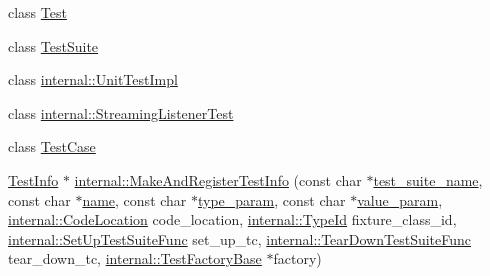 \begin{DoxyCompactItemize}
\item 
class \mbox{\hyperlink{classtesting_1_1_test_info_ab085d1bf4cff8b1045750706b11f8662}{Test}}
\item 
class \mbox{\hyperlink{classtesting_1_1_test_info_afa75eb3bdc22807c1d4fcf818c6f0fbf}{Test\+Suite}}
\item 
class \mbox{\hyperlink{classtesting_1_1_test_info_aa684cc13a8f91b00c0c9ce41ec7474eb}{internal\+::\+Unit\+Test\+Impl}}
\item 
class \mbox{\hyperlink{classtesting_1_1_test_info_a2021083660b7387a257fb6c6242fee73}{internal\+::\+Streaming\+Listener\+Test}}
\item 
class \mbox{\hyperlink{classtesting_1_1_test_info_aff779e55b06adfa7c0088bd10253f0f0}{Test\+Case}}
\item 
\mbox{\hyperlink{classtesting_1_1_test_info}{Test\+Info}} $\ast$ \mbox{\hyperlink{classtesting_1_1_test_info_a63d61c7ffd0423b1d3615f0ff5f2040e}{internal\+::\+Make\+And\+Register\+Test\+Info}} (const char $\ast$\mbox{\hyperlink{classtesting_1_1_test_info_a82a84ffd0e4d18eb5a3f97a2077e12cc}{test\+\_\+suite\+\_\+name}}, const char $\ast$\mbox{\hyperlink{classtesting_1_1_test_info_ac2581b45eccc9a3b94cb41c4807d0e34}{name}}, const char $\ast$\mbox{\hyperlink{classtesting_1_1_test_info_a7759bc57f4350ad406cbbb0b3bcea320}{type\+\_\+param}}, const char $\ast$\mbox{\hyperlink{classtesting_1_1_test_info_abdf2c6cfcf4819e725816c64e1c1fc24}{value\+\_\+param}}, \mbox{\hyperlink{structtesting_1_1internal_1_1_code_location}{internal\+::\+Code\+Location}} code\+\_\+location, \mbox{\hyperlink{namespacetesting_1_1internal_a38c435cbab5f8b784e2e7f3356cab242}{internal\+::\+Type\+Id}} fixture\+\_\+class\+\_\+id, \mbox{\hyperlink{namespacetesting_1_1internal_a028e9455ad22171feabf84fe46329c92}{internal\+::\+Set\+Up\+Test\+Suite\+Func}} set\+\_\+up\+\_\+tc, \mbox{\hyperlink{namespacetesting_1_1internal_ab58aba5acd47d329b72a1d10c7b61648}{internal\+::\+Tear\+Down\+Test\+Suite\+Func}} tear\+\_\+down\+\_\+tc, \mbox{\hyperlink{classtesting_1_1internal_1_1_test_factory_base}{internal\+::\+Test\+Factory\+Base}} $\ast$factory)
\item 

\end{DoxyCompactItemize}
